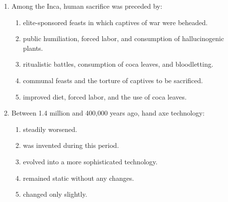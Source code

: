 \documentclass[12pt]{article}
\begin{document}
\begin{enumerate}[label=\arabic*.]
\begin{enumerate}[label=(\alph*)]
\end{enumerate}
\item Among the Inca, human sacrifice was preceded by:
\begin{enumerate}[label=(\alph*)]
    \item elite-sponsored feasts in which captives of war were beheaded.
    \item public humiliation, forced labor, and consumption of hallucinogenic plants.
    \item ritualistic battles, consumption of coca leaves, and bloodletting.
    \item communal feasts and the torture of captives to be sacrificed.
    \item improved diet, forced labor, and the use of coca leaves.
\end{enumerate}
\item Between 1.4 million and 400,000 years ago, hand axe technology:
\begin{enumerate}[label=(\alph*)]
    \item steadily worsened.
    \item was invented during this period.
    \item evolved into a more sophisticated technology.
    \item remained static without any changes.
    \item changed only slightly.
\end{enumerate}
\end{enumerate}
\end{document}
